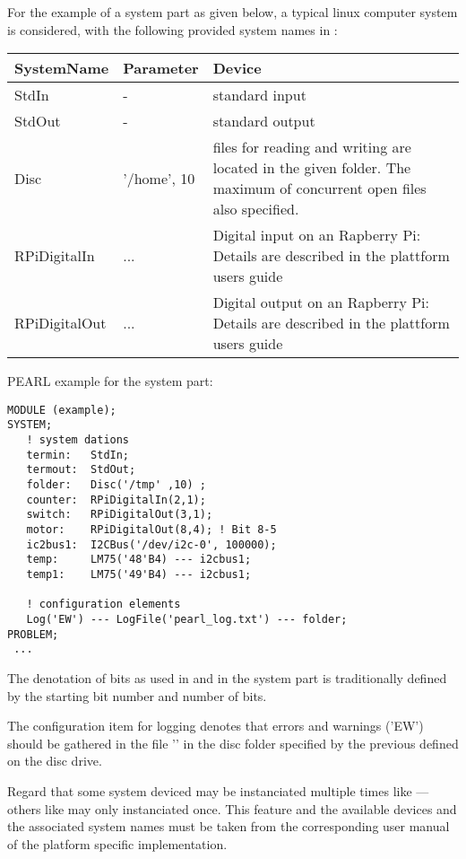 
For the example of a system part as given below, a typical linux computer
system is considered, with the following provided system names in \OpenPEARL{}:

\begin{tabular}{ll@{\x}p{8cm}}
SystemName & Parameter & Device \\ \hline
StdIn  &  - & standard input \\
StdOut  &  - & standard output \\
Disc       & '/home', 10 & files for reading and writing are located in the given folder. The maximum of concurrent open files also specified. \\
RPiDigitalIn & ... & Digital input on an Rapberry Pi: Details are described in 
		the plattform users guide \\
RPiDigitalOut & ... & Digital output on an Rapberry Pi: Details are described in 
		the plattform users guide \\
\end{tabular}

PEARL example for the system part:

\begin{lstlisting}
MODULE (example); 
SYSTEM; 
   ! system dations 
   termin:   StdIn; 
   termout:  StdOut;
   folder:   Disc('/tmp' ,10) ;  
   counter:  RPiDigitalIn(2,1); 
   switch:   RPiDigitalOut(3,1); 
   motor:    RPiDigitalOut(8,4); ! Bit 8-5
   ic2bus1:  I2CBus('/dev/i2c-0', 100000);
   temp:     LM75('48'B4) --- i2cbus1;
   temp1:    LM75('49'B4) --- i2cbus1;

   ! configuration elements 
   Log('EW') --- LogFile('pearl_log.txt') --- folder; 
PROBLEM;
 ...
\end{lstlisting}


The denotation of bits as used in  and 
in the system part is traditionally
defined by the starting bit number and number of bits.

The configuration item for logging denotes that errors and warnings ('EW')
should be gathered in the file '' in the disc folder specified
by the previous defined  on the disc drive.


Regard that some system deviced may be instanciated multiple times like 
--- others like  may only instanciated once.
 This feature and 
the available devices and the associated system names must be taken from
the corresponding user manual of the \OpenPEARL{} platform 
specific implementation.

